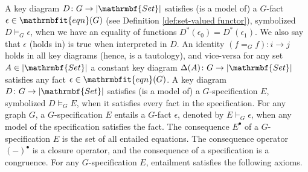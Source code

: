 \documentclass{amsart}
\def\to{\rightarrow}
\def\taking{\colon}
\def\Set{{\bf Set}}
\def\mcC{{\mathcal C}}
\theoremstyle{remark}
\theoremstyle{definition}
\begin{document}
A key diagram $D \colon G \rightarrow |\mathrmbf{Set}|$ 
satisfies (is a model of) a $G$-fact $\epsilon \in \mathrmbfit{eqn}(G)$
%
%
(see Definition \ref{def:set-valued functor}),
symbolized $D \models_{G} \epsilon$, 
when we have an equality of functions $D^\ast(\epsilon_{0}) = D^\ast(\epsilon_{1})$.
%
We also say that
$\epsilon$ (holds in) is true when interpreted in $D$. 
An identity
$(f =_{G} f) \colon i \rightarrow j$
holds in all key diagrams (hence, is a tautology),
and vice-versa
for any set $A \in |\mathrmbf{Set}|$
a constant key diagram
$\Delta(A) \colon G \to |\mathrmbf{Set}|$
satisfies any fact $\epsilon \in \mathrmbfit{eqn}(G)$. 
%
A key diagram $D \colon G \rightarrow |\mathrmbf{Set}|$ satisfies (is a model of) a $G$-specification $E$, 
symbolized $D \models_{G} E$, 
when it satisfies every fact in the specification.
%
%
For any graph $G$,
a $G$-specification $E$ entails a $G$-fact $\epsilon$,
denoted by $E \vdash_{G} \epsilon$,
when any model of the specification satisfies the fact.
%
The consequence $E^{\scriptscriptstyle\bullet}$ of a $G$-specification $E$ is the set of all entailed equations.
The consequence operator $(-)^{\scriptscriptstyle\bullet}$ is a closure operator,
and the consequence of a specification is a congruence.
%
For any $G$-specification $E$,
entailment satisfies the following axioms.
%
\end{document}
